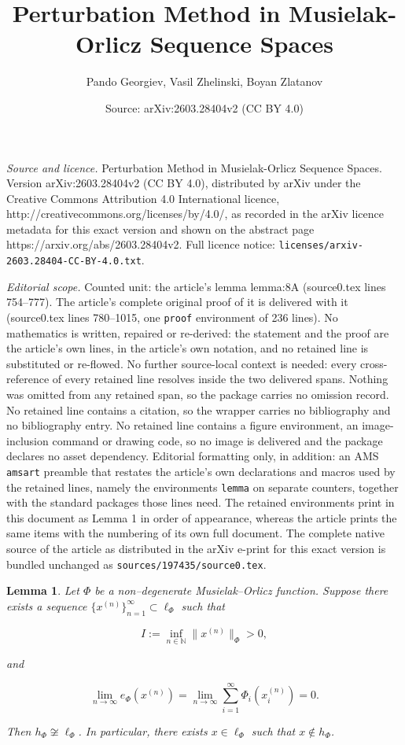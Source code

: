 \documentclass[10pt,a4paper]{amsart}
\title{Perturbation Method in Musielak-Orlicz Sequence Spaces}
\author{Pando Georgiev, Vasil Zhelinski, Boyan Zlatanov}
\date{Source: arXiv:2603.28404v2 (CC BY 4.0)}
\newtheorem{lemma}{Lemma}
\begin{document}
\maketitle

\noindent\emph{Source and licence.} Perturbation Method in Musielak-Orlicz Sequence Spaces. Version arXiv:2603.28404v2 (CC BY 4.0), distributed by arXiv under the Creative Commons Attribution 4.0 International licence, http://creativecommons.org/licenses/by/4.0/, as recorded in the arXiv licence metadata for this exact version and shown on the abstract page https://arxiv.org/abs/2603.28404v2. Full licence notice: \texttt{licenses/arxiv-2603.28404-CC-BY-4.0.txt}.\par\smallskip

\noindent\textit{Editorial scope.} Counted unit: the article's lemma lemma:8A (source0.tex lines 754--777). The article's complete original proof of it is delivered with it (source0.tex lines 780--1015, one \texttt{proof} environment of 236 lines). No mathematics is written, repaired or re-derived: the statement and the proof are the article's own lines, in the article's own notation, and no retained line is substituted or re-flowed.  No further source-local context is needed: every cross-reference of every retained line resolves inside the two delivered spans.  Nothing was omitted from any retained span, so the package carries no omission record.  No retained line contains a citation, so the wrapper carries no bibliography and no bibliography entry.  No retained line contains a figure environment, an image-inclusion command or drawing code, so no image is delivered and the package declares no asset dependency.  Editorial formatting only, in addition: an AMS \texttt{amsart} preamble that restates the article's own declarations and macros used by the retained lines, namely the environments \texttt{lemma} on separate counters, together with the standard packages those lines need.  The retained environments print in this document as Lemma 1 in order of appearance, whereas the article prints the same items with the numbering of its own full document.  The complete native source of the article as distributed in the arXiv e-print for this exact version is bundled unchanged as \texttt{sources/197435/source0.tex}.
\begin{lemma}\label{lemma:8A}
Let $\Phi$ be a non--degenerate Musielak--Orlicz function.  
Suppose there exists a sequence $\{x^{(n)}\}_{n=1}^\infty \subset \ell_\Phi$ such that


\[
I := \inf_{n\in\mathbb N} \|x^{(n)}\|_\Phi > 0,
\]


and


\[
\lim_{n\to\infty} e_\Phi(x^{(n)})
= \lim_{n\to\infty} \sum_{i=1}^\infty \Phi_i\!\left(x^{(n)}_i\right)
= 0.
\tag{9}
\]


Then $h_\Phi \not\cong \ell_\Phi$.  
In particular, there exists $x\in \ell_\Phi$ such that $x\notin h_\Phi$.
\end{lemma}
\end{document}

